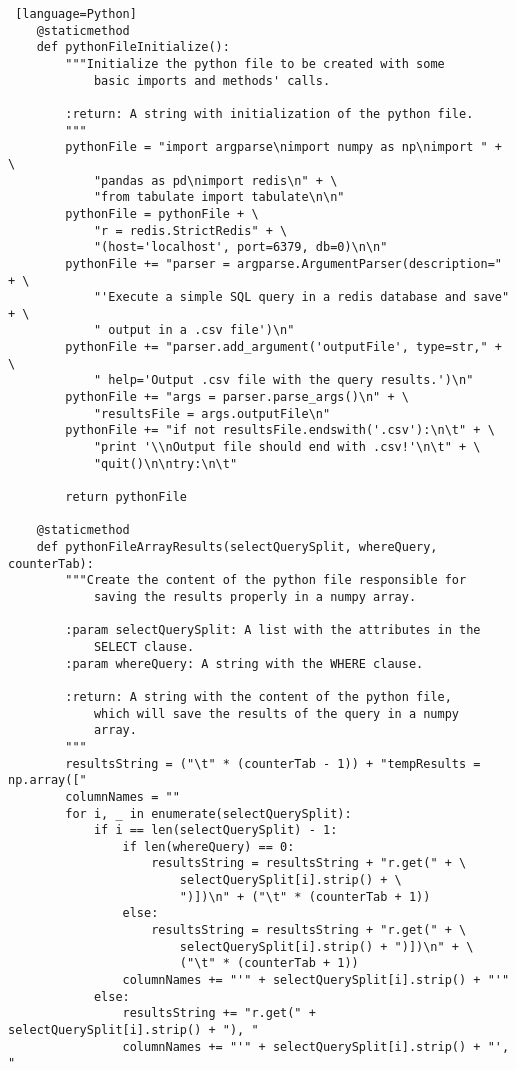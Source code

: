 \documentclass[11pt]{article}
\begin{document}
\begin{lstlisting} [language=Python]
    @staticmethod
    def pythonFileInitialize():
        """Initialize the python file to be created with some
            basic imports and methods' calls.

        :return: A string with initialization of the python file.
        """
        pythonFile = "import argparse\nimport numpy as np\nimport " + \
            "pandas as pd\nimport redis\n" + \
            "from tabulate import tabulate\n\n"
        pythonFile = pythonFile + \
            "r = redis.StrictRedis" + \
            "(host='localhost', port=6379, db=0)\n\n"
        pythonFile += "parser = argparse.ArgumentParser(description=" + \
            "'Execute a simple SQL query in a redis database and save" + \
            " output in a .csv file')\n"
        pythonFile += "parser.add_argument('outputFile', type=str," + \
            " help='Output .csv file with the query results.')\n"
        pythonFile += "args = parser.parse_args()\n" + \
            "resultsFile = args.outputFile\n"
        pythonFile += "if not resultsFile.endswith('.csv'):\n\t" + \
            "print '\\nOutput file should end with .csv!'\n\t" + \
            "quit()\n\ntry:\n\t"

        return pythonFile

    @staticmethod
    def pythonFileArrayResults(selectQuerySplit, whereQuery, counterTab):
        """Create the content of the python file responsible for
            saving the results properly in a numpy array.

        :param selectQuerySplit: A list with the attributes in the
            SELECT clause.
        :param whereQuery: A string with the WHERE clause.

        :return: A string with the content of the python file,
            which will save the results of the query in a numpy
            array.
        """
        resultsString = ("\t" * (counterTab - 1)) + "tempResults = np.array(["
        columnNames = ""
        for i, _ in enumerate(selectQuerySplit):
            if i == len(selectQuerySplit) - 1:
                if len(whereQuery) == 0:
                    resultsString = resultsString + "r.get(" + \
                        selectQuerySplit[i].strip() + \
                        ")])\n" + ("\t" * (counterTab + 1))
                else:
                    resultsString = resultsString + "r.get(" + \
                        selectQuerySplit[i].strip() + ")])\n" + \
                        ("\t" * (counterTab + 1))
                columnNames += "'" + selectQuerySplit[i].strip() + "'"
            else:
                resultsString += "r.get(" + selectQuerySplit[i].strip() + "), "
                columnNames += "'" + selectQuerySplit[i].strip() + "', "


\end{lstlisting}
\end{document}
